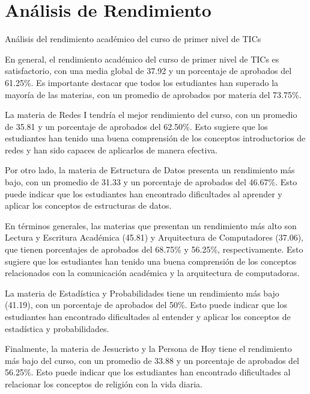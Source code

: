 \vspace{1cm}
\section{Análisis de Rendimiento}
Análisis del rendimiento académico del curso de primer nivel de TICs

En general, el rendimiento académico del curso de primer nivel de TICs es satisfactorio, con una media global de 37.92 y un porcentaje de aprobados del 61.25\%. Es importante destacar que todos los estudiantes han superado la mayoría de las materias, con un promedio de aprobados por materia del 73.75\%.

La materia de Redes I tendría el mejor rendimiento del curso, con un promedio de 35.81 y un porcentaje de aprobados del 62.50\%. Esto sugiere que los estudiantes han tenido una buena comprensión de los conceptos introductorios de redes y han sido capaces de aplicarlos de manera efectiva.

Por otro lado, la materia de Estructura de Datos presenta un rendimiento más bajo, con un promedio de 31.33 y un porcentaje de aprobados del 46.67\%. Esto puede indicar que los estudiantes han encontrado dificultades al aprender y aplicar los conceptos de estructuras de datos.

En términos generales, las materias que presentan un rendimiento más alto son Lectura y Escritura Académica (45.81) y Arquitectura de Computadores (37.06), que tienen porcentajes de aprobados del 68.75\% y 56.25\%, respectivamente. Esto sugiere que los estudiantes han tenido una buena comprensión de los conceptos relacionados con la comunicación académica y la arquitectura de computadoras.

La materia de Estadística y Probabilidades tiene un rendimiento más bajo (41.19), con un porcentaje de aprobados del 50\%. Esto puede indicar que los estudiantes han encontrado dificultades al entender y aplicar los conceptos de estadística y probabilidades.

Finalmente, la materia de Jesucristo y la Persona de Hoy tiene el rendimiento más bajo del curso, con un promedio de 33.88 y un porcentaje de aprobados del 56.25\%. Esto puede indicar que los estudiantes han encontrado dificultades al relacionar los conceptos de religión con la vida diaria.

